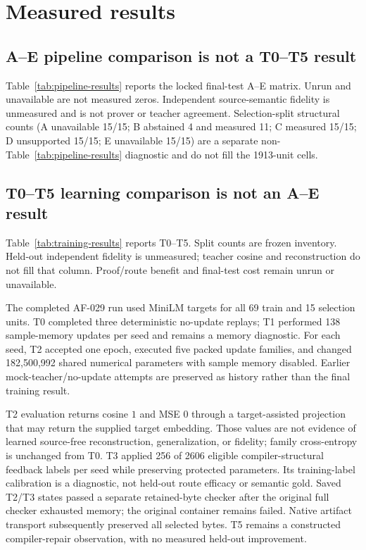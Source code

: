 \documentclass{article}
\begin{document}


\section{Measured results}
\subsection{A--E pipeline comparison is not a T0--T5 result}
Table~\ref{tab:pipeline-results} reports the locked final-test A--E matrix. Unrun and unavailable are not measured zeros. Independent source-semantic fidelity is unmeasured and is not prover or teacher agreement. Selection-split structural counts (A unavailable 15/15; B abstained 4 and measured 11; C measured 15/15; D unsupported 15/15; E unavailable 15/15) are a separate non-Table~\ref{tab:pipeline-results} diagnostic and do not fill the 1913-unit cells.



\subsection{T0--T5 learning comparison is not an A--E result}
Table~\ref{tab:training-results} reports T0--T5. Split counts are frozen inventory. Held-out independent fidelity is unmeasured; teacher cosine and reconstruction do not fill that column. Proof/route benefit and final-test cost remain unrun or unavailable.



The completed AF-029 run used MiniLM targets for all 69 train and 15 selection units. T0 completed three deterministic no-update replays; T1 performed 138 sample-memory updates per seed and remains a memory diagnostic. For each seed, T2 accepted one epoch, executed five packed update families, and changed 182{,}500{,}992 shared numerical parameters with sample memory disabled. Earlier mock-teacher/no-update attempts are preserved as history rather than the final training result.

T2 evaluation returns cosine $1$ and MSE $0$ through a target-assisted projection that may return the supplied target embedding. Those values are not evidence of learned source-free reconstruction, generalization, or fidelity; family cross-entropy is unchanged from T0. T3 applied 256 of 2606 eligible compiler-structural feedback labels per seed while preserving protected parameters. Its training-label calibration is a diagnostic, not held-out route efficacy or semantic gold. Saved T2/T3 states passed a separate retained-byte checker after the original full checker exhausted memory; the original container remains failed. Native artifact transport subsequently preserved all selected bytes. T5 remains a constructed compiler-repair observation, with no measured held-out improvement.
\end{document}
